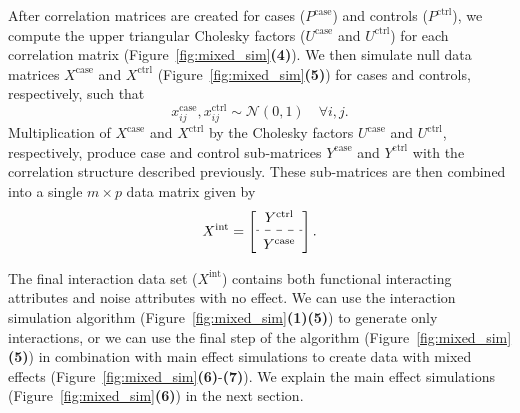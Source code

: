\documentclass[10pt,letterpaper]{article}
\begin{document}
After correlation matrices are created for cases ($P^\text{case}$) and controls ($P^\text{ctrl}$), we compute the upper triangular Cholesky factors ($U^\text{case}$ and $U^\text{ctrl}$) for each correlation matrix (Figure~\ref{fig:mixed_sim}\textbf{(4)}). We then simulate null data matrices $X^\text{case}$ and $X^\text{ctrl}$  (Figure~\ref{fig:mixed_sim}\textbf{(5)}) for cases and controls, respectively, such that 
\begin{equation}\label{eq:null_case_ctrl}
x^\text{case}_{ij}, x^\text{ctrl}_{ij} \sim \mathcal{N}(0,1) \quad \forall i,j.
\end{equation}
Multiplication of $X^\text{case}$ and $X^\text{ctrl}$ by the Cholesky factors $U^\text{case}$ and $U^\text{ctrl}$, respectively, produce case and control sub-matrices $Y^\text{case}$ and $Y^\text{ctrl}$ with the correlation structure described previously. These sub-matrices are then combined into a single $m \times p$ data matrix given by
%
\begin{equation}\label{eq:full_interaction_data}
X^\text{int} = \left[
\begin{array}{c}
Y^\text{ctrl} \\ [0.5ex]
\hdashline \\ [-1.7ex]
Y^\text{case}
\end{array}
\right].
\end{equation}
%

The final interaction data set ($X^\text{int}$) contains both functional interacting attributes and noise attributes with no effect. We can use the interaction simulation algorithm (Figure~\ref{fig:mixed_sim}\textbf{(1)}\textbf{(5)}) to generate only interactions, or we can use the final step of the algorithm (Figure~\ref{fig:mixed_sim}\textbf{(5)}) in combination with main effect simulations to create data with mixed effects (Figure~\ref{fig:mixed_sim}\textbf{(6)}-\textbf{(7)}). We explain the main effect simulations (Figure~\ref{fig:mixed_sim}\textbf{(6)}) in the next section.

\end{document}

